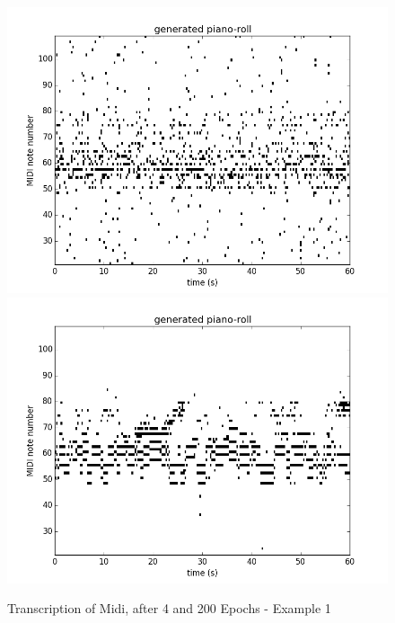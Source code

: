 \documentclass[letterpaper, 10 pt, conference]{ieeeconf}
\begin{document}
\begin{figure}[thpb]
      \centering
      \includegraphics[scale=0.35]{epoch_1_1.png}
      \includegraphics[scale=0.35]{epoch_200_1.png}
      \caption{Transcription of Midi, after 4 and 200 Epochs - Example 1}
      \label{fig:ex1}
\end{figure}
\end{document}
